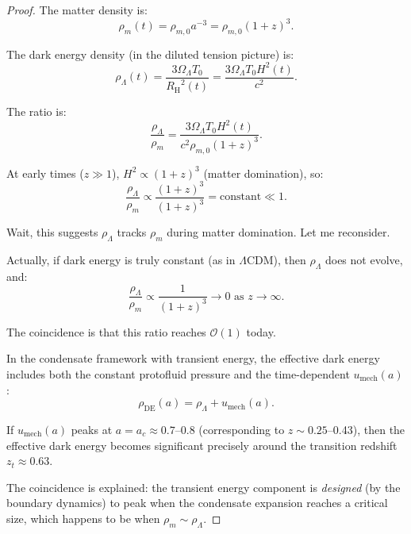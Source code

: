 \documentclass[11pt,a4paper]{article}
\newcommand{\Tzero}{\ensuremath{T_0}}
\newcommand{\RH}{\ensuremath{R_{\mathrm{H}}}}
\newcommand{\umech}{\ensuremath{u_{\mathrm{mech}}}}
\newcommand{\OmegaLam}{\ensuremath{\Omega_\Lambda}}
\theoremstyle{definition}
\theoremstyle{remark}
\begin{document}
\begin{proof}
The matter density is:
\begin{equation}
\rho_m(t) = \rho_{m,0} a^{-3} = \rho_{m,0}(1+z)^3.
\end{equation}

The dark energy density (in the diluted tension picture) is:
\begin{equation}
\rho_\Lambda(t) = \frac{3\OmegaLam \Tzero}{\RH^2(t)} = \frac{3\OmegaLam \Tzero H^2(t)}{c^2}.
\end{equation}

The ratio is:
\begin{equation}
\frac{\rho_\Lambda}{\rho_m} = \frac{3\OmegaLam \Tzero H^2(t)}{c^2 \rho_{m,0}(1+z)^3}.
\end{equation}

At early times ($z \gg 1$), $H^2 \propto (1+z)^3$ (matter domination), so:
\begin{equation}
\frac{\rho_\Lambda}{\rho_m} \propto \frac{(1+z)^3}{(1+z)^3} = \text{constant} \ll 1.
\end{equation}

Wait, this suggests $\rho_\Lambda$ tracks $\rho_m$ during matter domination. Let me reconsider.

Actually, if dark energy is truly constant (as in $\Lambda$CDM), then $\rho_\Lambda$ does not evolve, and:
\begin{equation}
\frac{\rho_\Lambda}{\rho_m} \propto \frac{1}{(1+z)^3} \to 0 \text{ as } z \to \infty.
\end{equation}

The coincidence is that this ratio reaches $\mathcal{O}(1)$ today.

In the condensate framework with transient energy, the effective dark energy includes both the constant protofluid pressure and the time-dependent $\umech(a)$:
\begin{equation}
\rho_{\mathrm{DE}}(a) = \rho_\Lambda + \umech(a).
\end{equation}

If $\umech(a)$ peaks at $a = a_c \approx 0.7$--0.8 (corresponding to $z \sim 0.25$--0.43), then the effective dark energy becomes significant precisely around the transition redshift $z_t \approx 0.63$.

The coincidence is explained: the transient energy component is \emph{designed} (by the boundary dynamics) to peak when the condensate expansion reaches a critical size, which happens to be when $\rho_m \sim \rho_\Lambda$. \qedhere
\end{proof}
\end{document}
